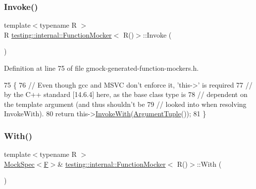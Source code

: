\subsubsection{\texorpdfstring{Invoke()}{Invoke()}}
{\footnotesize\ttfamily template$<$typename R $>$ \\
R \hyperlink{classtesting_1_1internal_1_1FunctionMocker}{testing\+::internal\+::\+Function\+Mocker}$<$ R()$>$\+::Invoke (\begin{DoxyParamCaption}{ }\end{DoxyParamCaption})\hspace{0.3cm}{\ttfamily [inline]}}



Definition at line 75 of file gmock-\/generated-\/function-\/mockers.\+h.


\begin{DoxyCode}
75              \{
76     \textcolor{comment}{// Even though gcc and MSVC don't enforce it, 'this->' is required}
77     \textcolor{comment}{// by the C++ standard [14.6.4] here, as the base class type is}
78     \textcolor{comment}{// dependent on the template argument (and thus shouldn't be}
79     \textcolor{comment}{// looked into when resolving InvokeWith).}
80     \textcolor{keywordflow}{return} this->\hyperlink{classtesting_1_1internal_1_1FunctionMockerBase_a869ec713f000b4e7829c660efc25e8cd}{InvokeWith}(\hyperlink{classtesting_1_1internal_1_1FunctionMocker_3_01R_07_08_4_a5a279e0d8414bf0809405c06a0725b66}{ArgumentTuple}());
81   \}
\end{DoxyCode}
\mbox{\label{classtesting_1_1internal_1_1FunctionMocker_3_01R_07_08_4_af5151d1ae246fab13ac6e890fa2599be}} 
\subsubsection{\texorpdfstring{With()}{With()}}
{\footnotesize\ttfamily template$<$typename R $>$ \\
\hyperlink{classtesting_1_1internal_1_1MockSpec}{Mock\+Spec}$<$\hyperlink{classtesting_1_1internal_1_1FunctionMocker_3_01R_07_08_4_a2c1d7da413176d87405227df90a95521}{F}$>$\& \hyperlink{classtesting_1_1internal_1_1FunctionMocker}{testing\+::internal\+::\+Function\+Mocker}$<$ R()$>$\+::With (\begin{DoxyParamCaption}{ }\end{DoxyParamCaption})\hspace{0.3cm}{\ttfamily [inline]}}



